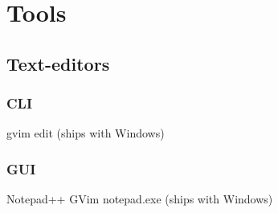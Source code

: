 
\chapter{Tools}\label{tools}
\section{Text-editors}\label{text-editors}
\subsection{CLI}
gvim
edit (ships with Windows)

\subsection{GUI}
Notepad++
GVim
notepad.exe (ships with Windows)    
